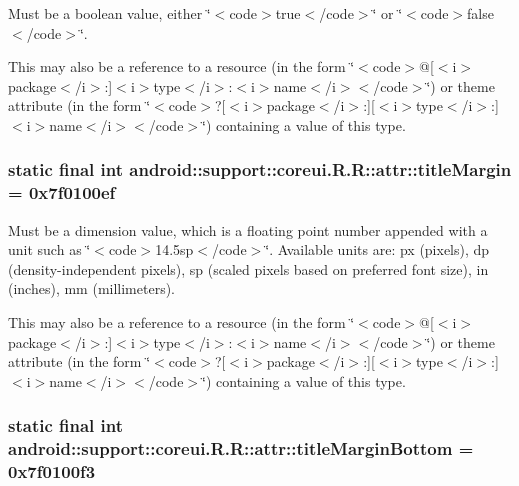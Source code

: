 Must be a boolean value, either \char`\"{}$<$code$>$true$<$/code$>$\char`\"{} or \char`\"{}$<$code$>$false$<$/code$>$\char`\"{}. 

This may also be a reference to a resource (in the form \char`\"{}$<$code$>$@\mbox{[}$<$i$>$package$<$/i$>$:\mbox{]}$<$i$>$type$<$/i$>$:$<$i$>$name$<$/i$>$$<$/code$>$\char`\"{}) or theme attribute (in the form \char`\"{}$<$code$>$?\mbox{[}$<$i$>$package$<$/i$>$:\mbox{]}\mbox{[}$<$i$>$type$<$/i$>$:\mbox{]}$<$i$>$name$<$/i$>$$<$/code$>$\char`\"{}) containing a value of this type. \hypertarget{classandroid_1_1support_1_1coreui_1_1_r_1_1attr_c9621227d362847291634595f03f998a}{
\subsubsection[{titleMargin}]{\setlength{\rightskip}{0pt plus 5cm}static final int android::support::coreui.R.R::attr::titleMargin = 0x7f0100ef}}
\label{classandroid_1_1support_1_1coreui_1_1_r_1_1attr_c9621227d362847291634595f03f998a}


Must be a dimension value, which is a floating point number appended with a unit such as \char`\"{}$<$code$>$14.5sp$<$/code$>$\char`\"{}. Available units are: px (pixels), dp (density-independent pixels), sp (scaled pixels based on preferred font size), in (inches), mm (millimeters). 

This may also be a reference to a resource (in the form \char`\"{}$<$code$>$@\mbox{[}$<$i$>$package$<$/i$>$:\mbox{]}$<$i$>$type$<$/i$>$:$<$i$>$name$<$/i$>$$<$/code$>$\char`\"{}) or theme attribute (in the form \char`\"{}$<$code$>$?\mbox{[}$<$i$>$package$<$/i$>$:\mbox{]}\mbox{[}$<$i$>$type$<$/i$>$:\mbox{]}$<$i$>$name$<$/i$>$$<$/code$>$\char`\"{}) containing a value of this type. \hypertarget{classandroid_1_1support_1_1coreui_1_1_r_1_1attr_bd7ecbdefebcac74c2b2bb044d37252d}{
\subsubsection[{titleMarginBottom}]{\setlength{\rightskip}{0pt plus 5cm}static final int android::support::coreui.R.R::attr::titleMarginBottom = 0x7f0100f3}}
\label{classandroid_1_1support_1_1coreui_1_1_r_1_1attr_bd7ecbdefebcac74c2b2bb044d37252d}


